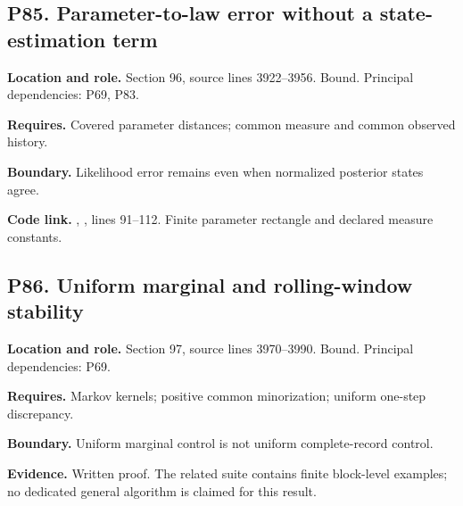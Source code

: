 \documentclass[11pt,letterpaper]{article}
\begin{document}
\par\noindent\begin{minipage}{\textwidth}
\subsection{P85. Parameter-to-law error without a state-estimation
term}\label{p85.-parameter-to-law-error-without-a-state-estimation-term}

\textbf{Location and role.} Section 96, source lines 3922--3956. Bound.
Principal dependencies: P69, P83.

\textbf{Requires.} Covered parameter distances; common measure and
common observed history.

\textbf{Boundary.} Likelihood error remains even when normalized
posterior states agree.

\textbf{Code link.} ,
, lines 91--112. Finite parameter rectangle
and declared measure constants.
\end{minipage}\par\medskip

\par\noindent\begin{minipage}{\textwidth}
\subsection{P86. Uniform marginal and rolling-window
stability}\label{p86.-uniform-marginal-and-rolling-window-stability}

\textbf{Location and role.} Section 97, source lines 3970--3990. Bound.
Principal dependencies: P69.

\textbf{Requires.} Markov kernels; positive common minorization; uniform
one-step discrepancy.

\textbf{Boundary.} Uniform marginal control is not uniform
complete-record control.

\textbf{Evidence.} Written proof. The related suite contains finite
block-level examples; no dedicated general algorithm is claimed for this
result.
\end{minipage}\par\medskip
\end{document}
